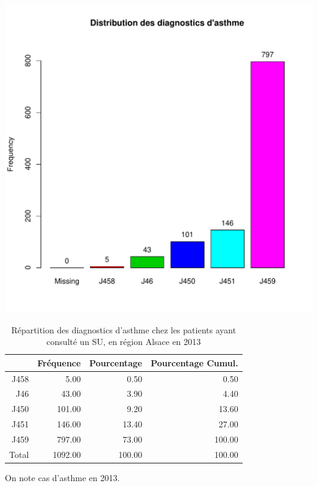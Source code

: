 \documentclass[12pt,english,french,twoside]{report}\usepackage[]{graphicx}\usepackage[]{color}
\makeatletter
\def\maxwidth{ %
  \ifdim\Gin@nat@width>\linewidth
    \linewidth
  \else
    \Gin@nat@width
  \fi
}
\makeatother
\begin{document}
\includegraphics[width=\maxwidth]{figure/asthme} 
\begin{table}[ht]
\centering
\begin{tabular}{rrrr}
  \hline
 & Fréquence & Pourcentage & Pourcentage Cumul. \\ 
  \hline
J458 & 5.00 & 0.50 & 0.50 \\ 
  J46 & 43.00 & 3.90 & 4.40 \\ 
  J450 & 101.00 & 9.20 & 13.60 \\ 
  J451 & 146.00 & 13.40 & 27.00 \\ 
  J459 & 797.00 & 73.00 & 100.00 \\ 
    Total & 1092.00 & 100.00 & 100.00 \\ 
   \hline
\end{tabular}
\caption[Répartition des diagnostics d'asthme]{Répartition des diagnostics d'asthme chez les patients ayant consulté un  SU, en région Alsace en 2013} 
\label{tab:asthme}
\end{table}



On note  cas d'asthme en 2013.
\end{document}
